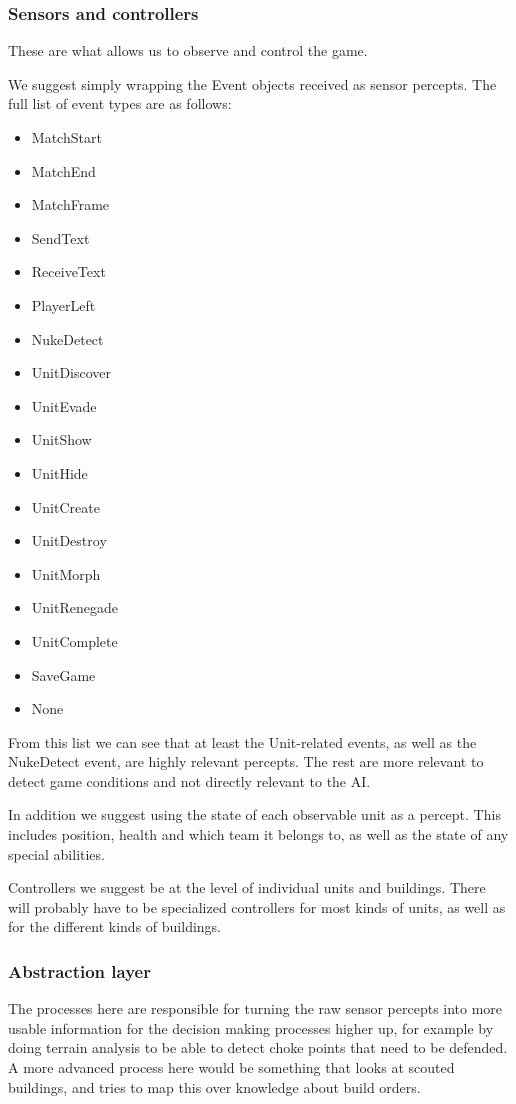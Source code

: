 \subsubsection{Sensors and controllers}
These are what allows us to observe and control the game.

We suggest simply wrapping the Event objects received as sensor percepts. The
full list of event types are as follows:
\begin{itemize}
    \item MatchStart
    \item MatchEnd
    \item MatchFrame
    \item SendText
    \item ReceiveText
    \item PlayerLeft
    \item NukeDetect
    \item UnitDiscover
    \item UnitEvade
    \item UnitShow
    \item UnitHide
    \item UnitCreate
    \item UnitDestroy
    \item UnitMorph
    \item UnitRenegade
    \item UnitComplete
    \item SaveGame
    \item None 
\end{itemize}
From this list we can see that at least the Unit-related events, as well as the
NukeDetect event, are highly relevant percepts. The rest are more relevant to
detect game conditions and not directly relevant to the AI.

In addition we suggest using the state of each observable unit as a percept.
This includes position, health and which team it belongs to, as well as the
state of any special abilities.

Controllers we suggest be at the level of individual units and buildings. There
will probably have to be specialized controllers for most kinds of units, as
well as for the different kinds of buildings.

\subsubsection{Abstraction layer}
The processes here are responsible for turning the raw sensor percepts into
more usable information for the decision making processes higher up, for
example by doing terrain analysis to be able to detect choke points that need
to be defended. A more advanced process here would be something that looks at
scouted buildings, and tries to map this over knowledge about build orders.

